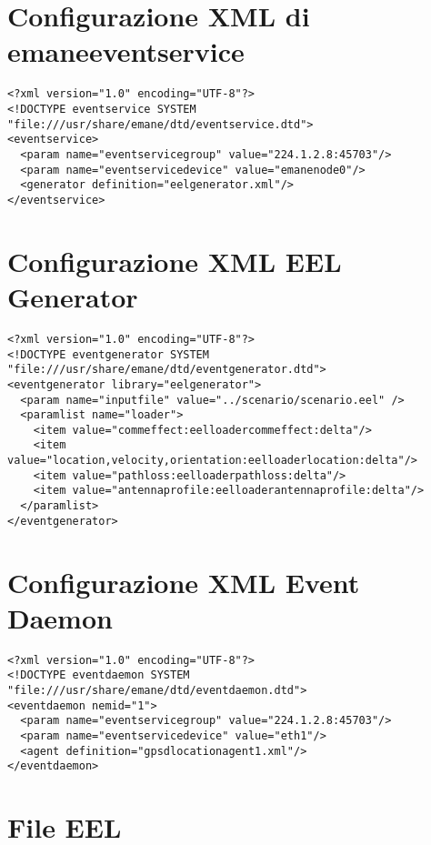 \section{Configurazione XML di emaneeventservice}
\label{app:emaneeventservice}

\lstset{language=XML}
\begin{lstlisting}
<?xml version="1.0" encoding="UTF-8"?>
<!DOCTYPE eventservice SYSTEM "file:///usr/share/emane/dtd/eventservice.dtd">
<eventservice>
  <param name="eventservicegroup" value="224.1.2.8:45703"/>
  <param name="eventservicedevice" value="emanenode0"/>
  <generator definition="eelgenerator.xml"/>
</eventservice>
\end{lstlisting}

\section{Configurazione XML EEL Generator}
\label{app:eel_generator}

\lstset{language=XML}
\begin{lstlisting}
<?xml version="1.0" encoding="UTF-8"?>
<!DOCTYPE eventgenerator SYSTEM "file:///usr/share/emane/dtd/eventgenerator.dtd">
<eventgenerator library="eelgenerator">
  <param name="inputfile" value="../scenario/scenario.eel" />
  <paramlist name="loader">
    <item value="commeffect:eelloadercommeffect:delta"/>
    <item value="location,velocity,orientation:eelloaderlocation:delta"/>
    <item value="pathloss:eelloaderpathloss:delta"/>
    <item value="antennaprofile:eelloaderantennaprofile:delta"/>
  </paramlist>
</eventgenerator>
\end{lstlisting}

\section{Configurazione XML Event Daemon}
\label{app:event_daemon}

\lstset{language=XML}
\begin{lstlisting}
<?xml version="1.0" encoding="UTF-8"?>
<!DOCTYPE eventdaemon SYSTEM "file:///usr/share/emane/dtd/eventdaemon.dtd">
<eventdaemon nemid="1">
  <param name="eventservicegroup" value="224.1.2.8:45703"/>
  <param name="eventservicedevice" value="eth1"/>
  <agent definition="gpsdlocationagent1.xml"/>
</eventdaemon>
\end{lstlisting}

\section{File EEL}
\label{app:eel_file}


